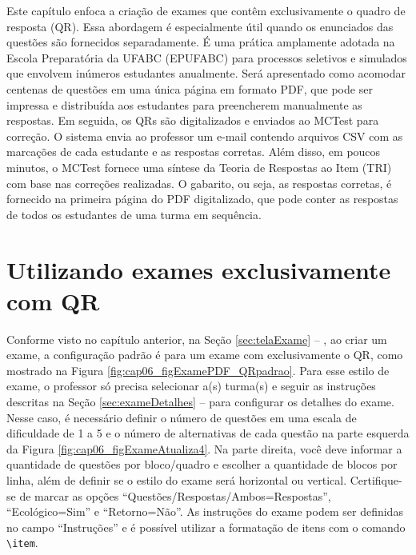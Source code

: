 \label{ch:examesQR}

Este capítulo enfoca a criação de exames que contêm exclusivamente o quadro de resposta (QR). Essa abordagem é especialmente útil quando os enunciados das questões são fornecidos separadamente. É uma prática amplamente adotada na Escola Preparatória da UFABC (EPUFABC) para processos seletivos e simulados que envolvem inúmeros estudantes anualmente. Será apresentado como acomodar centenas de questões em uma única página em formato PDF, que pode ser impressa e distribuída aos estudantes para preencherem manualmente as respostas. Em seguida, os QRs são digitalizados e enviados ao MCTest para correção. O sistema envia ao professor um e-mail contendo arquivos CSV com as marcações de cada estudante e as respostas corretas. Além disso, em poucos minutos, o MCTest fornece uma síntese da Teoria de Respostas ao Item (TRI) com base nas correções realizadas. O gabarito, ou seja, as respostas corretas, é fornecido na primeira página do PDF digitalizado, que pode conter as respostas de todos os estudantes de uma turma em sequência.

\section{Utilizando exames exclusivamente com QR}\label{sec:examesQR}

Conforme visto no capítulo anterior, na Seção \ref{sec:telaExame} -- , ao criar um exame, a configuração padrão é para um exame com exclusivamente o QR, como mostrado na Figura \ref{fig:cap06_figExamePDF_QRpadrao}. Para esse estilo de exame, o professor só precisa selecionar a(s) turma(s) e seguir as instruções descritas na Seção \ref{sec:exameDetalhes} --  para configurar os detalhes do exame. Nesse caso, é necessário definir o número de questões em uma escala de dificuldade de 1 a 5 e o número de alternativas de cada questão na parte esquerda da Figura \ref{fig:cap06_figExameAtualiza4}. Na parte direita, você deve informar a quantidade de questões por bloco/quadro e escolher a quantidade de blocos por linha, além de definir se o estilo do exame será horizontal ou vertical. Certifique-se de marcar as opções ``Questões/Respostas/Ambos=Respostas'', ``Ecológico=Sim'' e ``Retorno=Não''. As instruções do exame podem ser definidas no campo ``Instruções'' e é possível utilizar a formatação de itens com o comando \verb|\item|. 

